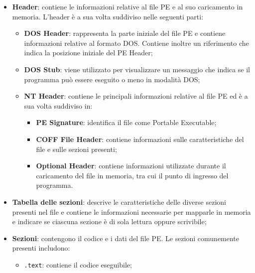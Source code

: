 \begin{itemize}
    \item \textbf{Header}: contiene le informazioni relative
    al file PE e al suo caricamento in memoria. L'header è a sua volta
    suddiviso nelle seguenti parti:

    \vspace{-0.5em}
    \begin{itemize}
        \item \textbf{DOS Header}: rappresenta la parte iniziale del file PE
        e contiene informazioni relative al formato DOS. Contiene inoltre un
        riferimento che indica la posizione iniziale del PE Header;

        \item \textbf{DOS Stub}: viene utilizzato per visualizzare un messaggio
        che indica se il programma può essere eseguito o meno in modalità DOS;

        \item \textbf{NT Header}: contiene le principali informazioni
        relative al file PE ed è a sua volta suddiviso in:

        \begin{itemize}
            \item \textbf{PE Signature}: identifica il file come Portable
            Executable;

            \item \textbf{COFF File Header}: contiene informazioni sulle
            caratteristiche del file e sulle sezioni presenti;

            \item \textbf{Optional Header}: contiene informazioni utilizzate
            durante il caricamento del file in memoria, tra cui il punto di
            ingresso del programma.
        \end{itemize}
    \end{itemize}

    \item \textbf{Tabella delle sezioni}: descrive le caratteristiche delle
    diverse sezioni presenti nel file e contiene le informazioni necessarie
    per mapparle in memoria e indicare se ciascuna sezione è di sola lettura
    oppure scrivibile;

    \item \textbf{Sezioni}: contengono il codice e i dati del file PE.
    Le sezioni comunemente presenti includono:

    \begin{itemize}
        \item \texttt{.text}: contiene il codice eseguibile;


\end{itemize}
\end{itemize}
